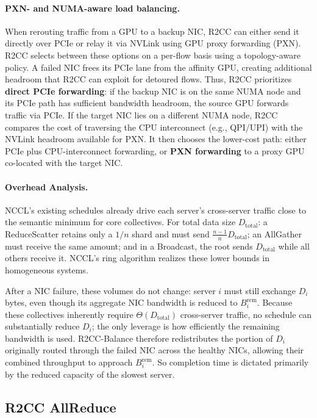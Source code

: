 \documentclass[letterpaper,twocolumn,10pt]{article}
\begin{document}
\paragraph{PXN- and NUMA-aware load balancing.}
When rerouting traffic from a GPU to a backup NIC, R2CC can either send it directly over PCIe or relay it via NVLink using GPU proxy forwarding (PXN). R2CC selects between these options on a per-flow basis using a topology-aware policy. A failed NIC frees its PCIe lane from the affinity GPU, creating additional headroom that R2CC can exploit for detoured flows. Thus, R2CC prioritizes {\bf direct PCIe forwarding}: if the backup NIC is on the same NUMA node and its PCIe path has sufficient bandwidth headroom, the source GPU forwards traffic via PCIe. If the target NIC lies on a different NUMA node, R2CC compares the cost of traversing the CPU interconnect (e.g., QPI/UPI) with the NVLink headroom available for PXN. It then chooses the lower-cost path: either PCIe plus CPU-interconnect forwarding, or {\bf PXN forwarding} to a proxy GPU co-located with the target NIC.

\paragraph{Overhead Analysis.} NCCL's existing schedules already drive each server's cross-server traffic close to the semantic minimum for core collectives. For total data size $D_{\text{total}}$: a ReduceScatter retains only a $1/n$ shard and must send $\frac{n-1}{n}D_{\text{total}}$; an AllGather must receive the same amount; and in a Broadcast, the root sends $D_{\text{total}}$ while all others receive it. NCCL's ring algorithm realizes these lower bounds in homogeneous systems.

After a NIC failure, these volumes do not change: server $i$ must still exchange $D_i$ bytes, even though its aggregate NIC bandwidth is reduced to $B_i^{\text{rem}}$. Because these collectives inherently require $\Theta(D_{\text{total}})$ cross-server traffic, no schedule can substantially reduce $D_i$; the only leverage is how efficiently the remaining bandwidth is used. R2CC-Balance therefore redistributes the portion of $D_i$ originally routed through the failed NIC across the healthy NICs, allowing their combined throughput to approach $B_i^{\text{rem}}$. So completion time is dictated primarily by the reduced capacity of the slowest server.

\subsection{R2CC AllReduce}
\end{document}
